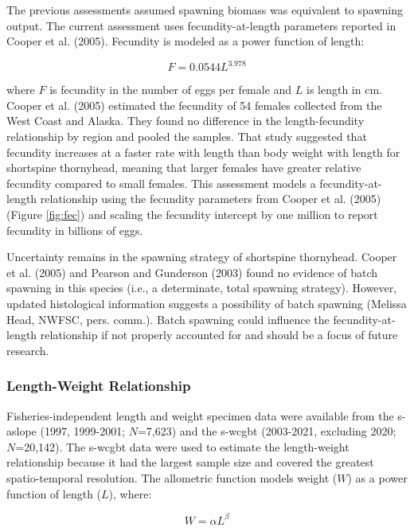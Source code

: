\documentclass[11pt,
  english,
  letterpaper,
]{article}
\begin{document}
The previous assessments assumed spawning biomass was equivalent to spawning output. The current assessment uses fecundity-at-length parameters reported in Cooper et al. (2005). Fecundity is modeled as a power function of length:

\begin{equation} F = 0.0544L^{3.978} \end{equation}

where \(F\) is fecundity in the number of eggs per female and \(L\) is length in cm. Cooper et al. (2005) estimated the fecundity of 54 females collected from the West Coast and Alaska. They found no difference in the length-fecundity relationship by region and pooled the samples. That study suggested that fecundity increases at a faster rate with length than body weight with length for shortspine thornyhead, meaning that larger females have greater relative fecundity compared to small females. This assessment models a fecundity-at-length relationship using the fecundity parameters from Cooper et al. (2005) (Figure \ref{fig:fec}) and scaling the fecundity intercept by one million to report fecundity in billions of eggs.

Uncertainty remains in the spawning strategy of shortspine thornyhead. Cooper et al. (2005) and Pearson and Gunderson (2003) found no evidence of batch spawning in this species (i.e., a determinate, total spawning strategy). However, updated histological information suggests a possibility of batch spawning (Melissa Head, NWFSC, pers. comm.). Batch spawning could influence the fecundity-at-length relationship if not properly accounted for and should be a focus of future research.

\hypertarget{length-weight-relationship}{%
\subsubsection{Length-Weight Relationship}\label{length-weight-relationship}}

Fisheries-independent length and weight specimen data were available from the \gls{s-aslope} (1997, 1999-2001; \(N\)=7,623) and the \gls{s-wcgbt} (2003-2021, excluding 2020; \(N\)=20,142). The \gls{s-wcgbt} data were used to estimate the length-weight relationship because it had the largest sample size and covered the greatest spatio-temporal resolution. The allometric function models weight (\(W\)) as a power function of length (\(L\)), where:

\begin{equation} W = \alpha L^{\beta} \end{equation}
\end{document}
